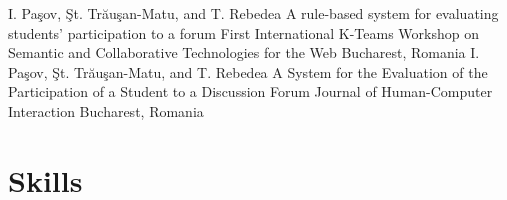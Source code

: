 \documentclass[11pt,a4paper,sans]{moderncv}
\begin{document}
{I. Pa\c{s}ov, \c{S}t. Tr\u{a}u\c{s}an-Matu, and T. Rebedea}
{A rule-based system for evaluating students' participation to a forum}
{First International K-Teams Workshop on Semantic and Collaborative Technologies for the Web}
{Bucharest, Romania}{}
{I. Pa\c{s}ov, \c{S}t. Tr\u{a}u\c{s}an-Matu, and T. Rebedea}
{A System for the Evaluation of the Participation of a Student to a Discussion Forum}
{Journal of Human-Computer Interaction}
{Bucharest, Romania}{}


\section{Skills}






\end{document}
